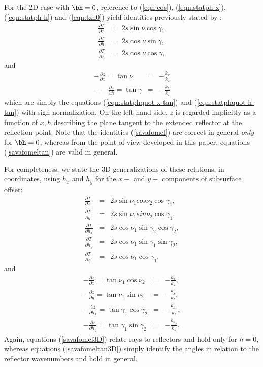 For the 2D case with $\bh=0$, reference to (\ref{eqn:cos}), (\ref{eqn:statph-x}), (\ref{eqn:statph-h}) and (\ref{eqn:tzh0}) yield identities previously stated by \cite{SavaFomel:03}:
\begin{eqnarray}
\label{savafomel}
\frac{\partial T}{\partial x} &=& 2 s \sin\nu \cos\gamma, \nonumber \\
\frac{\partial T}{\partial h} &=& 2 s \cos\nu \sin\gamma, \nonumber \\
\frac{\partial T}{\partial z} &=& 2 s \cos\nu \cos\gamma,
\end{eqnarray}
and
\begin{eqnarray}
-\frac{\partial z}{\partial x} = \tan \nu &=& -\frac{k_x}{k_z} \nonumber \\
-\label{savafomeltan}
-\frac{\partial z}{\partial h} = \tan \gamma &=& -\frac{k_h}{k_z}
\end{eqnarray}
which are simply the equations (\ref{eqn:statphquot-x-tan}) and (\ref{eqn:statphquot-h-tan}) with sign normalization. On the left-hand side, $z$ is regarded implicitly as a function of $x,h$ describing the plane tangent to the extended reflector at the reflection point.
Note that the identities (\ref{savafomel}) are correct in general {\em only} for $\bh=0$, whereas from the point of view developed in this paper, equations (\ref{savafomeltan}) are valid in general. 

For completeness, we state the 3D generalizations of these relations, in coordinates, using $h_x$ and $h_y$ for the $x-$ and $y-$ components of subsurface offset:
\begin{eqnarray}
\label{savafomel3D}
\frac{\partial T}{\partial x} &=& 2 s \sin\nu_1 cos\nu_2 \cos\gamma_1, \nonumber \\
\frac{\partial T}{\partial y} &=& 2 s \sin\nu_1 sin\nu_2 \cos\gamma_1, \nonumber \\
\frac{\partial T}{\partial h_x} &=& 2 s \cos\nu_1 \sin\gamma_2\cos\gamma_2, \nonumber \\
\frac{\partial T}{\partial h_y} &=& 2 s \cos\nu_1\sin\gamma_1\sin\gamma_2, \nonumber \\
\frac{\partial T}{\partial z} &=& 2 s \cos\nu_1\cos\gamma_1,
\end{eqnarray}
and 
\begin{eqnarray}
\label{savafomeltan3D}
-\frac{\partial z}{\partial x} = \tan \nu_1\cos\nu_2 &=& -\frac{k_x}{k_z},\nonumber\\
-\frac{\partial z}{\partial y} = \tan \nu_1\sin\nu_2 &=& 
-\frac{k_y}{k_z}, \nonumber\\
-\frac{\partial z}{\partial h_x} = \tan \gamma_1\cos\gamma_2  &=& -\frac{k_{h_x}}{k_z}, \nonumber\\
-\frac{\partial z}{\partial h_y} = \tan \gamma_1\sin\gamma_2  &=& -\frac{k_{h_y}}{k_z}.
\end{eqnarray}
Again, equations (\ref{savafomel3D}) relate rays to reflectors and hold only for $h=0$, whereas equations (\ref{savafomeltan3D}) simply identify the angles in relation to the reflector wavenumbers and hold in general.
